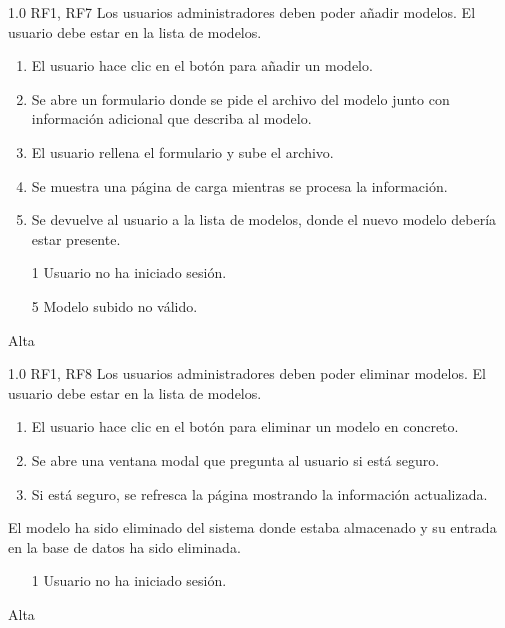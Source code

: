 {1.0}
{RF1, RF7}
{Los usuarios administradores deben poder añadir modelos.}
{El usuario debe estar en la lista de modelos.}
{
    \begin{enumerate}
        \def\labelenumi{\arabic{enumi}.}
        \tightlist
        \item El usuario hace clic en el botón para añadir un modelo.
        \item Se abre un formulario donde se pide el archivo del modelo junto
              con información adicional que describa al modelo.
        \item El usuario rellena el formulario y sube el archivo.
        \item Se muestra una página de carga mientras se procesa la información.
        \item Se devuelve al usuario a la lista de modelos, donde el nuevo
              modelo debería estar presente.
    \end{enumerate}
}
{}
{
    \begin{itemize}
        \item [1] Usuario no ha iniciado sesión.
        \item [5] Modelo subido no válido.
    \end{itemize}
}
{Alta}

{1.0}
{RF1, RF8}
{Los usuarios administradores deben poder eliminar modelos.}
{El usuario debe estar en la lista de modelos.}
{
    \begin{enumerate}
        \def\labelenumi{\arabic{enumi}.}
        \tightlist
        \item El usuario hace clic en el botón para eliminar un modelo en concreto.
        \item Se abre una ventana modal que pregunta al usuario si está seguro.
        \item Si está seguro, se refresca la página mostrando la información actualizada.
    \end{enumerate}
}
{
    El modelo ha sido eliminado del sistema donde estaba almacenado y su entrada en
    la base de datos ha sido eliminada.
}
{
    \begin{itemize}
        \item [1] Usuario no ha iniciado sesión.
    \end{itemize}
}
{Alta}

